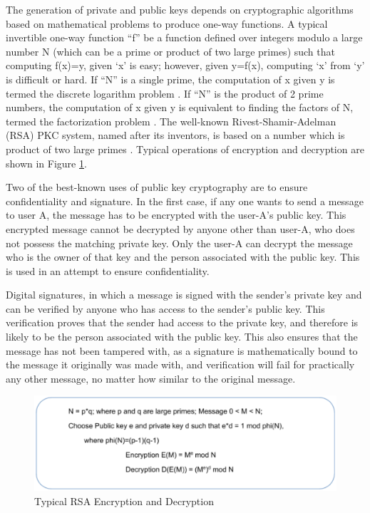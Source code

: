 \begin{multicols}{2}
The generation of private and public keys depends on cryptographic algorithms based on mathematical problems to produce one-way functions. A typical invertible one-way function ``f'' be a function defined over integers modulo a large number N (which can be a prime or product of two large primes) such that computing f(x)=y, given `x' is easy; however, given y=f(x), computing `x' from `y' is difficult or hard. If ``N'' is a single prime, the computation of x given y is termed the discrete logarithm problem \cite{chap2-key1}. If ``N'' is the product of 2 prime numbers, the computation of x given y is equivalent to finding the factors of N, termed the factorization problem \cite{chap2-key1}. The well-known Rivest-Shamir-Adelman (RSA) PKC system, named after its inventors, is based on a number which is product of two large primes \cite{chap2-key14}. Typical operations of encryption and decryption are shown in Figure \ref{chap2-fig4}. 

Two of the best-known uses of public key cryptography are to ensure confidentiality and signature. In the first case, if any one wants to send a message to user A, the message has to be encrypted with the user-A's public key. This encrypted message cannot be decrypted by anyone other than user-A, who does not possess the matching private key. Only the user-A can decrypt the message who is the owner of that key and the person associated with the public key. This is used in an attempt to ensure confidentiality.

Digital signatures, in which a message is signed with the sender's private key and can be verified by anyone who has access to the sender's public key. This verification proves that the sender had access to the private key, and therefore is likely to be the person associated with the public key. This also ensures that the message has not been tampered with, as a signature is mathematically bound to the message it originally was made with, and verification will fail for practically any other message, no matter how similar to the original message.
\end{multicols}


\begin{figure}[!ht]
\centering
\includegraphics{src/Figures/chap2/4.eps}
\caption{Typical RSA Encryption and Decryption}\label{chap2-fig4}
\end{figure}

